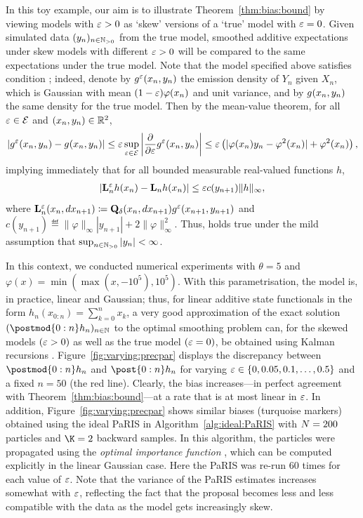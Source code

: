 In this toy example, our aim is to illustrate Theorem~\ref{thm:bias:bound} by viewing models with $\varepsilon > 0$ as `skew' versions of a `true' model with $\varepsilon = 0$. Given simulated data $(y_n)_{n \in \mathbb{N}_{> 0}}$ from the true model, smoothed additive expectations under skew models with different $\varepsilon > 0$ will be compared to the same expectations under the true model. Note that the model specified above satisfies condition ; indeed, denote by $g_{}^\varepsilon(x_n, y_n)$ the emission density of $Y_n$ given $X_n$, which is Gaussian with mean $(1 - \varepsilon) \varphi(x_n)$ and unit variance, and by $g_{}(x_n, y_n)$ the same density for the true model. Then by the mean-value theorem, for all $\varepsilon \in \mathcal{E}$ and $(x_n, y_n) \in \mathbb{R}^2$, 
$$
\left\vert g_{}^\varepsilon(x_n, y_n) - g_{}(x_n, y_n) \right \vert \leq \varepsilon \sup_{\varepsilon \in \mathcal{E}} \left \vert\frac{\partial}{\partial \varepsilon} g_{}^\varepsilon(x_n, y_n) \right\vert 
\leq \varepsilon \left( \vert \varphi(x_n) y_n - \varphi^2(x_n) \vert + \varphi^2(x_n) \right), 
$$
implying immediately that for all bounded measurable real-valued functions $h$,  
\begin{align*}
\left \vert \ukmod{n} h(x_n) - \uk{n} h(x_n) \right \vert \leq \precpar c(y_{n + 1}) \| h\|_\infty, 
\end{align*}
where $\mathbf{L}_{n}^\varepsilon(x_n, d x_{n + 1}) \coloneqq \mathbf{Q}_\delta(x_n, d x_{n + 1}) g_{}^\varepsilon(x_{n + 1}, y_{n + 1})$ and $c(y_{n + 1}) \eqdef \| \varphi \|_\infty |y_{n + 1}| + 2 \| \varphi \|_\infty^2$. Thus,  holds true under the mild assumption that $\sup_{n \in \mathbb{N}_{> 0}} |y_n| < \infty$. 

In this context, we conducted numerical experiments with $\theta = 5$ and $\varphi(x) = \min(\max(x, -10^5), 10^5)$. With this parametrisation, the model is, in practice, linear and Gaussian; thus, for linear additive state functionals in the form $h_n(x_{0:n}) = \sum_{k = 0}^n x_k$, a very good approximation of the exact solution $(\postmod{0:n} h_n)_{n \in \nset}$ to the optimal smoothing problem can, for the skewed models $(\varepsilon > 0)$ as well as the true model $(\varepsilon = 0)$, be obtained using Kalman recursions \cite{rauch1965maximum}. Figure~\ref{fig:varying:precpar} displays the discrepancy between $\postmod{0:n} h_n$ and $\post{0:n} h_n$ for varying $\varepsilon \in \{0, 0.05, 0.1, \ldots, 0.5 \}$ and a fixed $n = 50$ (the red line). Clearly, the bias increases---in perfect agreement with Theorem~\ref{thm:bias:bound}---at a rate that is at most linear in $\varepsilon$. In addition, Figure~\ref{fig:varying:precpar} shows similar biases (turquoise markers) obtained using the ideal PaRIS in Algorithm~\ref{alg:ideal:PaRIS} with $N = 200$ particles and $\K = 2$ backward samples. In this algorithm, the particles were propagated using the \textit{optimal importance function} \cite{doucet2000sequential}, which can be computed explicitly in the linear Gaussian case. Here the PaRIS was re-run $60$ times for each value of $\varepsilon$. Note that the variance of the PaRIS estimates increases somewhat with $\varepsilon$, reflecting the fact that the proposal becomes less and less compatible with the data as the model gets increasingly skew. 

